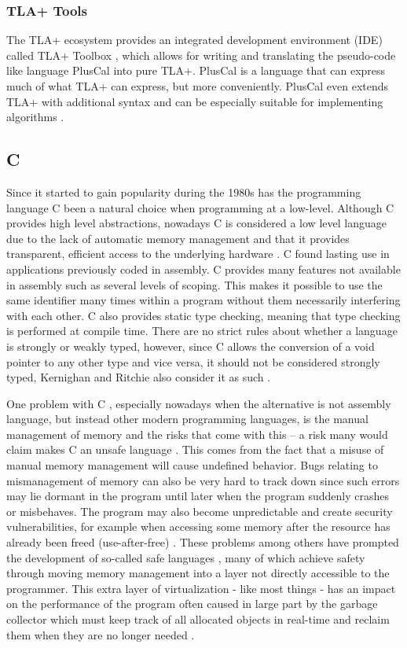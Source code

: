 \subsubsection*{TLA+ Tools}\label{tools}

The TLA+ ecosystem provides an integrated development environment (IDE) called TLA+ Toolbox \cite{TLATOOLBOX}, which allows for writing and translating the pseudo-code like language PlusCal into pure TLA+. PlusCal is a language that can express much of what TLA+ can express, but more conveniently. PlusCal even extends TLA+ with additional syntax and can be especially suitable for implementing algorithms \cite{PRACTICALTLA}.


\subsection{C}\label{c}

Since it started to gain popularity during the 1980s has the programming language C been a natural choice when programming at a low-level. Although C provides high level abstractions, nowadays C is considered a low level language due to the lack of automatic memory management and that it provides transparent, efficient access to the underlying hardware \cite{DEMYSTIFYING}. C found lasting use in applications previously coded in assembly. C provides many features not available in assembly such as several levels of scoping. This makes it possible to use the same identifier many times within a program without them necessarily interfering with each other. C also provides static type checking, meaning that type checking is performed at compile time. There are no strict rules about whether a language is strongly or weakly typed, however, since C allows the conversion of a void pointer to any other type and vice versa, it should not be considered strongly typed, Kernighan and Ritchie also consider it as such \cite{CPROGRAMMINGLANGUAGE}. 

One problem with C , especially nowadays when the alternative is not assembly language, but instead other modern programming languages, is the manual management of memory and the risks that come with this – a risk many would claim makes C an unsafe language \cite{RUSTONOMICON}. This comes from the fact that a misuse of manual memory management will cause undefined behavior. Bugs relating to mismanagement of memory can also be very hard to track down since such errors may lie dormant in the program until later when the program suddenly crashes or misbehaves. The program may also become unpredictable and create security vulnerabilities, for example when accessing some memory after the resource has already been freed (use-after-free) \cite{IMPACTOFUNDEFINED}. These problems among others have prompted the development of so-called safe languages \cite{JAVAWHITEPAPER}, many of which achieve safety through moving memory management into a layer not directly accessible to the programmer. This extra layer of virtualization - like most things - has an impact on the performance of the program often caused in large part by the garbage collector which must keep track of all allocated objects in real-time and reclaim them when they are no longer needed \cite{CPPJAVA}. 

